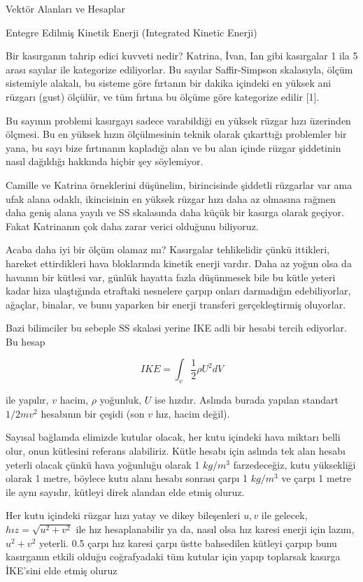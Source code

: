 \documentclass[12pt,fleqn]{article}\usepackage{../../common}
\begin{document}
Vektör Alanları ve Hesaplar

Entegre Edilmiş Kinetik Enerji (Integrated Kinetic Enerji)

Bir kasırganın tahrip edici kuvveti nedir? Katrina, İvan, Ian gibi kasırgalar 1
ila 5 arası sayılar ile kategorize ediliyorlar. Bu sayılar Saffir-Simpson
skalasıyla, ölçüm sistemiyle alakalı, bu sisteme göre fırtanın bir dakika
içindeki en yüksek ani rüzgarı (gust) ölçülür, ve tüm fırtına bu ölçüme göre
kategorize edilir [1].

Bu sayının problemi kasırgayı sadece varabildiği en yüksek rüzgar hızı üzerinden
ölçmesi. Bu en yüksek hızın ölçülmesinin teknik olarak çıkarttığı problemler bir
yana, bu sayı bize fırtınanın kapladığı alan ve bu alan içinde rüzgar şiddetinin
nasıl dağıldığı hakkında hiçbir şey söylemiyor.

Camille ve Katrina örneklerini düşünelim, birincisinde şiddetli rüzgarlar var
ama ufak alana odaklı, ikincisinin en yüksek rüzgar hızı daha az olmasına rağmen
daha geniş alana yayılı ve SS skalasında daha küçük bir kasırga olarak geçiyor.
Fakat Katrinanın çok daha zarar verici olduğunu biliyoruz.

Acaba daha iyi bir ölçüm olamaz mı? Kasırgalar tehlikelidir çünkü ittikleri,
hareket ettirdikleri hava bloklarında kinetik enerji vardır. Daha az yoğun olsa
da havanın bir kütlesi var, günlük hayatta fazla düşünmesek bile bu kütle yeteri
kadar hiza ulaştığında etraftaki nesnelere çarpıp onları darmadığın
edebiliyorlar, ağaçlar, binalar, ve bunu yaparken bir enerji transferi
gerçekleştirmiş oluyorlar.

Bazi bilimciler bu sebeple SS skalasi yerine IKE adli bir hesabi tercih
ediyorlar. Bu hesap

$$
IKE = \int_v \frac{1}{2} \rho U^2 dV
$$

ile yapılır, $v$ hacim, $\rho$ yoğunluk, $U$ ise hızdır. Aslında burada yapılan
standart $1/2 m v^2$ hesabının bir çeşidi (son $v$ hız, hacim değil).

Sayısal bağlamda elimizde kutular olacak, her kutu içindeki hava miktarı belli
olur, onun kütlesini referans alabiliriz. Kütle hesabı için aslında tek alan
hesabı yeterli olacak çünkü hava yoğunluğu olarak 1 $kg/m^3$ farzedeceğiz, kutu
yüksekliği olarak 1 metre, böylece kutu alanı hesabı sonrası çarpı 1 $kg/m^3$ ve
çarpı 1 metre ile aynı sayıdır, kütleyi direk alandan elde etmiş oluruz.

Her kutu içindeki rüzgar hızı yatay ve dikey bileşenleri $u,v$ ile gelecek, $hız
= \sqrt{u^2+v^2}$ ile hız hesaplanabilir ya da, nasıl olsa hız karesi enerji
için lazım, $u^2+v^2$ yeterli. 0.5 çarpı hız karesi çarpı üstte bahsedilen
kütleyi çarpıp bunu kasırganın etkili olduğu coğrafyadaki tüm kutular için
yapıp toplarsak kasırga İKE'sini elde etmiş oluruz 
\end{document}
